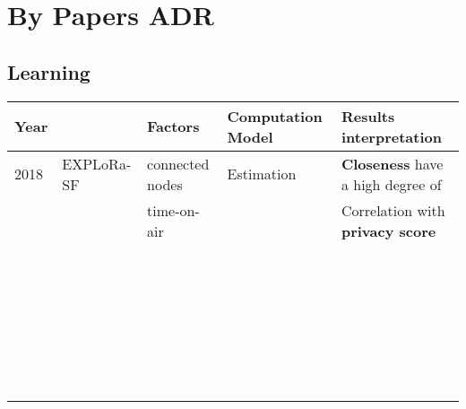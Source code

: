 \onecolumn
\setlength{\hoffset}{-.5in}

\section{By Papers ADR}

\subsection{Learning}
\begin{longtable}{lllll}
	Year  & \                                              & \textbf{Factors}           & \textbf{Computation Model}             & \textbf{Results interpretation}                               \\\hline
	2018  & EXPLoRa-SF \cite{cuomo_explora_2017}           & connected nodes            & Estimation                             & \textbf{Closeness} have a high degree of                      \\
	\     &                                                & time-on-air                &                                        & Correlation with \textbf{privacy score}                       \\\hline
	\     &                                                &                               &                                        &                                                               \\
	\     &                                                &                               &                                        &                                                               \\
	\     &                                                &                               &                                        &                                                               \\
	\     &                                                &                               &                                        &                                                               \\
	\     &                                                &                               &                                        &                                                               \\
	\     &                                                &                               &                                        &                                                               \\

\end{longtable}
